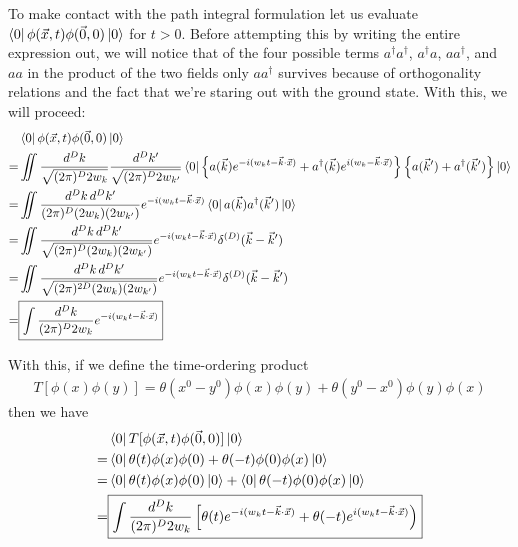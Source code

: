 \documentclass{book}
\theoremstyle{definition}
\newcommand{\f}[2]{\frac{#1}{#2}}
\newcommand{\rp}{\right)}
\newcommand{\lb}{\left[}
\newcommand{\lc}{\left\{}
\newcommand{\rc}{\right\}}
\begin{document}
To make contact with the path integral formulation let us evaluate $\bra{0}\phi(\vec{x},t)\phi(\vec{0},0)\ket{0}$ for $t > 0$. Before attempting this by writing the entire expression out, we will notice that of the four possible terms $a^\dagger a^\dagger$, $a^\dagger a$, $a a^\dagger$, and $aa$ in the product of the two fields only $a a^\dagger$ survives because of orthogonality relations and the fact that we're staring out with the ground state. With this, we will proceed:
\begin{align}
  &\bra{0}\phi(\vec{x},t)\phi(\vec{0},0)\ket{0} \nonumber\\
= &\iint \f{d^D k}{\sqrt{(2\pi)^D 2w_k}} \f{d^D k'}{\sqrt{(2\pi)^D 2w_{k'}}}
\bra{0}\lc a(\vec{k})e^{-i(w_k t - \vec{k}\cdot\vec{x})} + a^\dagger(\vec{k})e^{i(w_k - \vec{k}\cdot\vec{x})} \rc \lc a(\vec{k}') + a^\dagger(\vec{k}') \rc\ket{0} \nonumber\\
= &\iint \f{d^Dk \,d^Dk'}{(2\pi)^D (2w_k)(2w_{k'})}e^{-i(w_k t - \vec{k}\cdot\vec{x})}\bra{0}a(\vec{k})a^\dagger(\vec{k}')\ket{0}\nonumber\\
= &\iint \f{d^Dk \,d^Dk'}{\sqrt{(2\pi)^D (2w_k)(2w_{k'})}}e^{-i(w_k t - \vec{k}\cdot\vec{x})}\delta^{(D)}(\vec{k} - \vec{k}')\nonumber\\
= &\iint \f{d^Dk \,d^Dk'}{\sqrt{(2\pi)^{2D} (2w_k)(2w_{k'})}}e^{-i(w_k t - \vec{k}\cdot\vec{x})}\delta^{(D)}(\vec{k} - \vec{k}')\nonumber\\
= &\boxed{\int \f{d^D k}{(2\pi)^{D} 2w_k}e^{-i(w_k t - \vec{k}\cdot\vec{x})}}
\end{align}


With this, if we define the time-ordering product 
\begin{align}
\boxed{T[\phi(x)\phi(y)] = \theta(x^0 - y^0) \phi(x)\phi(y) + \theta(y^0 - x^0)\phi(y)\phi(x)}
\end{align}
then we have
\begin{align}
  &\bra{0}T[\phi(\vec{x},t)\phi(\vec{0},0)]\ket{0} \nonumber\\
= &\bra{0}  \theta(t)\phi(x)\phi(0) + \theta(-t)\phi(0)\phi(x)   \ket{0} \nonumber\\
= &\bra{0}  \theta(t)\phi(x)\phi(0)\ket{0} + \bra{0}\theta(-t)\phi(0)\phi(x)  \ket{0} \nonumber\\
= & \boxed{\int \f{d^D k}{(2\pi)^D 2w_k}\lb \theta(t)e^{-i(w_k t - \vec{k}\cdot\vec{x})} + \theta(-t)e^{i(w_k t - \vec{k}\cdot\vec{x})} \rp}
\end{align}
\end{document}
